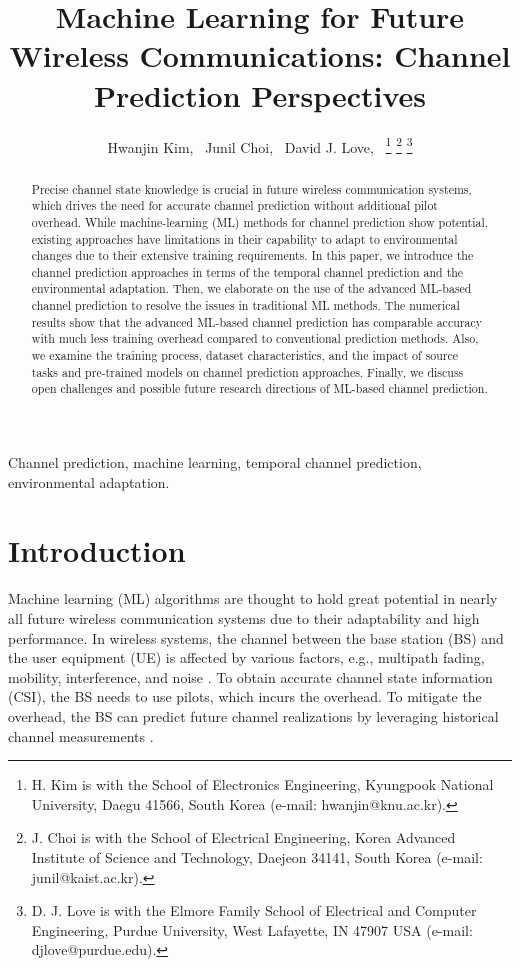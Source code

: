 \documentclass[lettersize,journal]{IEEEtran}
\begin{document}
\title{Machine Learning for Future Wireless Communications: Channel Prediction Perspectives}

\author{Hwanjin Kim,~ Junil Choi,~ David J. Love,~
\thanks{H. Kim is with the School of Electronics Engineering, Kyungpook National University, Daegu 41566, South Korea (e-mail: hwanjin@knu.ac.kr).}
\thanks{J. Choi is with the School of Electrical Engineering, Korea Advanced Institute of Science and Technology, Daejeon 34141, South Korea (e-mail: junil@kaist.ac.kr).}
\thanks{D. J. Love is with the Elmore Family School of Electrical and Computer Engineering, Purdue University, West Lafayette, IN 47907 USA (e-mail: djlove@purdue.edu).}}

\maketitle

\begin{abstract}
Precise channel state knowledge is crucial in future wireless communication systems, which drives the need for accurate channel prediction without additional pilot overhead. While machine-learning (ML) methods for channel prediction show potential, existing approaches have limitations in their capability to adapt to environmental changes due to their extensive training requirements. In this paper, we introduce the channel prediction approaches in terms of the temporal channel prediction and the environmental adaptation. Then, we elaborate on the use of the advanced ML-based channel prediction to resolve the issues in traditional ML methods. The numerical results show that the advanced ML-based channel prediction has comparable accuracy with much less training overhead compared to conventional prediction methods. Also, we examine the training process, dataset characteristics, and the impact of source tasks and pre-trained models on channel prediction approaches. Finally, we discuss open challenges and possible future research directions of ML-based channel prediction.
\end{abstract}

\begin{IEEEkeywords}
Channel prediction, machine learning, temporal channel prediction, environmental adaptation.
\end{IEEEkeywords}

\section{Introduction}
Machine learning (ML) algorithms are thought to hold great potential in nearly all future wireless communication systems due to their adaptability and high performance. In wireless systems, the channel between the base station (BS) and the user equipment (UE) is affected by various factors, e.g., multipath fading, mobility, interference, and noise \cite{Truong13}. To obtain accurate channel state information (CSI), the BS needs to use pilots, which incurs the overhead. To mitigate the overhead, the BS can predict future channel realizations by leveraging historical channel measurements \cite{Choi14}.
\end{document}
